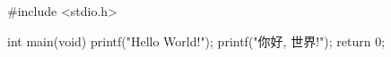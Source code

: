 \documentclass[nofonts]{ctexart}
\begin{document}
\begin{verbatim*}
#include <stdio.h>

int main(void)
{
        printf("Hello World!\n");
        printf("你好, 世界!");
        return 0;
}
\end{verbatim*}
\end{document}
